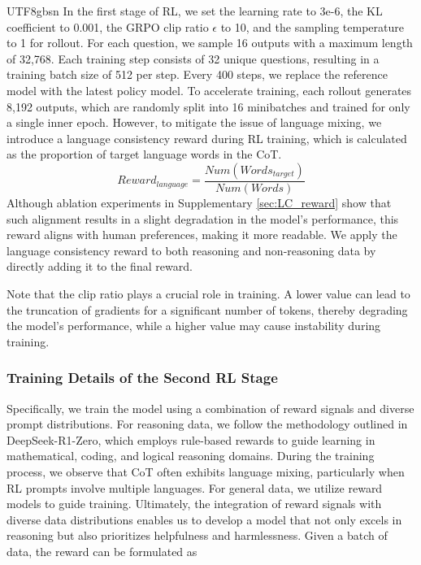 \documentclass[11pt, a4paper, logo, copyright, nonumbering]{deepseek}
\begin{document}
\begin{CJK*}{UTF8}{gbsn}
In the first stage of RL, we set the learning rate to 3e-6, the KL coefficient to 0.001, the GRPO clip ratio $\epsilon$ to 10, and the sampling temperature to 1 for rollout. For each question, we sample 16 outputs with a maximum length of 32,768. Each training step consists of 32 unique questions, resulting in a training batch size of 512 per step. Every 400 steps, we replace the reference model with the latest policy model. To accelerate training, each rollout generates 8,192 outputs, which are randomly split into 16 minibatches and trained for only a single inner epoch. However, to mitigate the issue of language mixing, we introduce a language consistency reward during RL training, which is calculated as the proportion of target language words in the CoT. 
\begin{equation}
    Reward_{language} = \frac{Num(Words_{target})}{Num(Words)}
\end{equation}
Although ablation experiments in Supplementary \ref{sec:LC_reward} show that such alignment results in a slight degradation in the model's performance, this reward aligns with human preferences, making it more readable. We apply the language consistency reward to both reasoning and non-reasoning data by directly adding it to the final reward. 

Note that the clip ratio plays a crucial role in training.  A lower value can lead to the truncation of gradients for a significant number of tokens, thereby degrading the model's performance, while a higher value may cause instability during training.



\subsubsection{Training Details of the Second RL Stage }\label{sec: r1-2-rl}
Specifically, we train the model using a combination of reward signals and diverse prompt distributions. For reasoning data, we follow the methodology outlined in DeepSeek-R1-Zero, which employs rule-based rewards to guide learning in mathematical, coding, and logical reasoning domains. During the training process, we observe that CoT often exhibits language mixing, particularly when RL prompts involve multiple languages. 
For general data, we utilize reward models to guide training. Ultimately, the integration of reward signals with diverse data distributions enables us to develop a model that not only excels in reasoning but also prioritizes helpfulness and harmlessness. Given a batch of data, the reward can be formulated as 


\end{CJK*}
\end{document}
